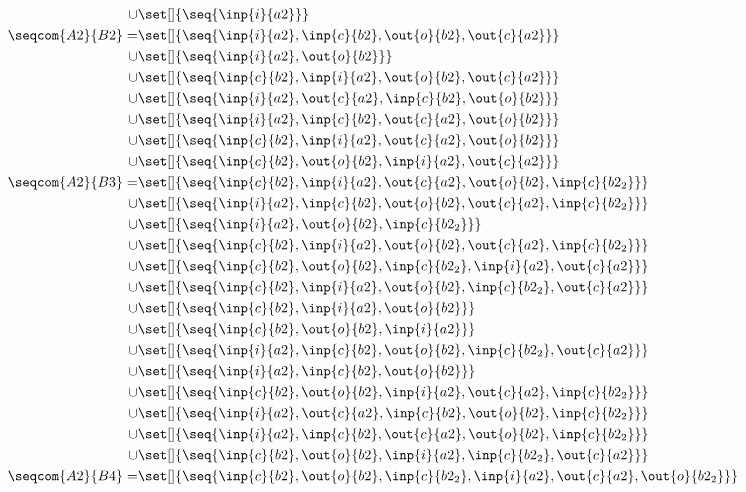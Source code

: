 \begin{align*}
\cup&\set[]{\seq{\inp{i}{a2}}}\\
%
\seqcom{A2}{B2} = &\set[]{\seq{\inp{i}{a2},\inp{c}{b2},\out{o}{b2},\out{c}{a2}}}\\
\cup&\set[]{\seq{\inp{i}{a2},\out{o}{b2}}}\\
\cup&\set[]{\seq{\inp{c}{b2},\inp{i}{a2},\out{o}{b2},\out{c}{a2}}}\\
\cup&\set[]{\seq{\inp{i}{a2},\out{c}{a2},\inp{c}{b2},\out{o}{b2}}}\\
\cup&\set[]{\seq{\inp{i}{a2},\inp{c}{b2},\out{c}{a2},\out{o}{b2}}}\\
\cup&\set[]{\seq{\inp{c}{b2},\inp{i}{a2},\out{c}{a2},\out{o}{b2}}}\\
\cup&\set[]{\seq{\inp{c}{b2},\out{o}{b2},\inp{i}{a2},\out{c}{a2}}}\\
%
\seqcom{A2}{B3} = &\set[]{\seq{\inp{c}{b2},\inp{i}{a2},\out{c}{a2},\out{o}{b2},\inp{c}{b2_2}}}\\
\cup&\set[]{\seq{\inp{i}{a2},\inp{c}{b2},\out{o}{b2},\out{c}{a2},\inp{c}{b2_2}}}\\
\cup&\set[]{\seq{\inp{i}{a2},\out{o}{b2},\inp{c}{b2_2}}}\\
\cup&\set[]{\seq{\inp{c}{b2},\inp{i}{a2},\out{o}{b2},\out{c}{a2},\inp{c}{b2_2}}}\\
\cup&\set[]{\seq{\inp{c}{b2},\out{o}{b2},\inp{c}{b2_2},\inp{i}{a2},\out{c}{a2}}}\\
\cup&\set[]{\seq{\inp{c}{b2},\inp{i}{a2},\out{o}{b2},\inp{c}{b2_2},\out{c}{a2}}}\\
\cup&\set[]{\seq{\inp{c}{b2},\inp{i}{a2},\out{o}{b2}}}\\
\cup&\set[]{\seq{\inp{c}{b2},\out{o}{b2},\inp{i}{a2}}}\\
\cup&\set[]{\seq{\inp{i}{a2},\inp{c}{b2},\out{o}{b2},\inp{c}{b2_2},\out{c}{a2}}}\\
\cup&\set[]{\seq{\inp{i}{a2},\inp{c}{b2},\out{o}{b2}}}\\
\cup&\set[]{\seq{\inp{c}{b2},\out{o}{b2},\inp{i}{a2},\out{c}{a2},\inp{c}{b2_2}}}\\
\cup&\set[]{\seq{\inp{i}{a2},\out{c}{a2},\inp{c}{b2},\out{o}{b2},\inp{c}{b2_2}}}\\
\cup&\set[]{\seq{\inp{i}{a2},\inp{c}{b2},\out{c}{a2},\out{o}{b2},\inp{c}{b2_2}}}\\
\cup&\set[]{\seq{\inp{c}{b2},\out{o}{b2},\inp{i}{a2},\inp{c}{b2_2},\out{c}{a2}}}\\
%
\seqcom{A2}{B4} = &\set[]{\seq{\inp{c}{b2},\out{o}{b2},\inp{c}{b2_2},\inp{i}{a2},\out{c}{a2},\out{o}{b2_2}}}\\

\end{align*}
